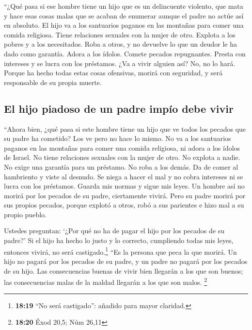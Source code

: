  ``¿Qué pasa si ese hombre tiene un hijo que es un
delincuente violento, que mata y hace esas cosas malas que se acaban de
enumerar  aunque el padre no actúe así en absoluto. El
hijo va a los santuarios paganos en las montañas para comer una comida
religiosa. Tiene relaciones sexuales con la mujer de otro.
 Explota a los pobres y a los necesitados. Roba a otros,
y no devuelve lo que un deudor le ha dado como garantía. Adora a los
ídolos. Comete pecados repugnantes.  Presta con intereses
y se lucra con los préstamos. ¿Va a vivir alguien así? No, no lo hará.
Porque ha hecho todas estas cosas ofensivas, morirá con seguridad, y
será responsable de su propia muerte.

\hypertarget{el-hijo-piadoso-de-un-padre-impuxedo-debe-vivir}{%
\subsection{El hijo piadoso de un padre impío debe
vivir}\label{el-hijo-piadoso-de-un-padre-impuxedo-debe-vivir}}

 ``Ahora bien, ¿qué pasa si este hombre tiene un hijo que
ve todos los pecados que su padre ha cometido? Los ve pero no hace lo
mismo.  No va a los santuarios paganos en las montañas
para comer una comida religiosa, ni adora a los ídolos de Israel. No
tiene relaciones sexuales con la mujer de otro.  No
explota a nadie. No exige una garantía para un préstamo. No roba a los
demás. Da de comer al hambriento y viste al desnudo.  Se
niega a hacer el mal y no cobra intereses ni se lucra con los préstamos.
Guarda mis normas y sigue mis leyes. Un hombre así no morirá por los
pecados de su padre, ciertamente vivirá.  Pero su padre
morirá por sus propios pecados, porque explotó a otros, robó a sus
parientes e hizo mal a su propio pueblo.

 Ustedes preguntan: `¿Por qué no ha de pagar el hijo por
los pecados de su padre?' Si el hijo ha hecho lo justo y lo correcto,
cumpliendo todas mis leyes, entonces vivirá, no será
castigado.\footnote{\textbf{18:19} ``No será castigado'': añadido para
  mayor claridad.}  ``Es la persona que peca la que
morirá. Un hijo no pagará por los pecados de su padre, y un padre no
pagará por los pecados de su hijo. Las consecuencias buenas de vivir
bien llegarán a los que son buenos; las consecuencias malas de la maldad
llegarán a los que son malos. \footnote{\textbf{18:20} Éxod 20,5; Núm
  26,11}

